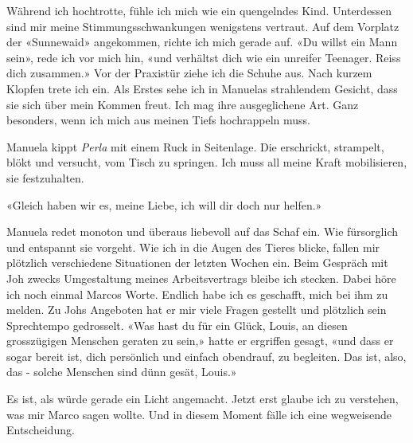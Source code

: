 Während ich hochtrotte, fühle ich mich wie ein quengelndes Kind.
Unterdessen sind mir meine Stimmungsschwankungen wenigstens vertraut.
Auf dem Vorplatz der «Sunnewaid» angekommen, richte ich mich gerade auf.
«Du willst ein Mann sein», rede ich vor mich hin, «und verhältst dich
wie ein unreifer Teenager. Reiss dich zusammen.»
Vor der Praxistür ziehe ich die Schuhe aus. Nach kurzem Klopfen trete
ich ein. Als Erstes sehe ich in Manuelas strahlendem Gesicht, dass sie
sich über mein Kommen freut. Ich mag ihre ausgeglichene Art. Ganz
besonders, wenn ich mich aus meinen Tiefs hochrappeln muss.

Manuela kippt \emph{Perla} mit einem Ruck in Seitenlage. Die erschrickt,
strampelt, blökt und versucht, vom Tisch zu springen. Ich muss all meine
Kraft mobilisieren, sie festzuhalten.

«Gleich haben wir es, meine Liebe, ich will dir doch nur helfen.»

Manuela redet monoton und überaus liebevoll auf das Schaf ein.
Wie fürsorglich und entspannt sie vorgeht.
Wie ich in die Augen des Tieres blicke, fallen mir plötzlich
verschiedene Situationen der letzten Wochen ein. Beim Gespräch mit Joh
zwecks Umgestaltung meines Arbeitsvertrags bleibe ich stecken. Dabei
höre ich noch einmal Marcos Worte. Endlich habe ich es geschafft, mich
bei ihm zu melden. Zu Johs Angeboten hat er mir viele Fragen gestellt
und plötzlich sein Sprechtempo gedrosselt.
«Was hast du für ein Glück, Louis, an diesen grosszügigen Menschen
geraten zu sein,» hatte er ergriffen gesagt, «und dass er sogar bereit
ist, dich persönlich und einfach obendrauf, zu begleiten. Das ist, also,
das - solche Menschen sind dünn gesät, Louis.»

Es ist, als würde gerade ein Licht angemacht. Jetzt erst glaube ich zu
verstehen, was mir Marco sagen wollte. Und in diesem Moment fälle ich eine wegweisende Entscheidung.
